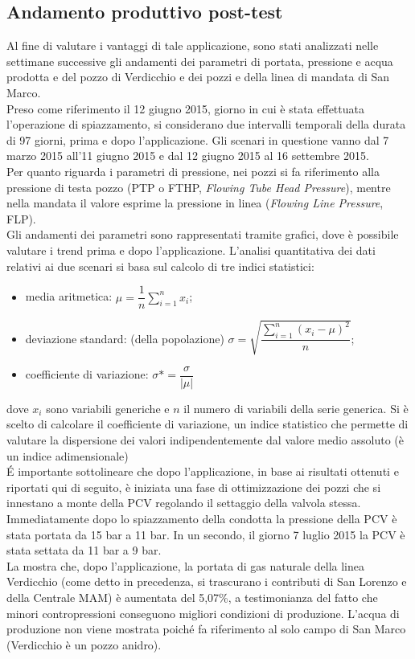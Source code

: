 \subsection{Andamento produttivo post-test}
Al fine di valutare i vantaggi di tale applicazione, sono stati analizzati nelle settimane successive gli andamenti dei parametri di portata, pressione e acqua prodotta e del pozzo di Verdicchio e dei pozzi e della linea di mandata di San Marco.\\
Preso come riferimento il 12 giugno 2015, giorno in cui è stata effettuata l'operazione di spiazzamento, si considerano due intervalli temporali della durata di 97 giorni, prima e dopo l'applicazione. Gli scenari in questione vanno dal 7 marzo 2015 all'11 giugno 2015 e dal 12 giugno 2015 al 16 settembre 2015.\\
Per quanto riguarda i parametri di pressione, nei pozzi si fa riferimento alla pressione di testa pozzo (PTP o FTHP, \textit{Flowing Tube Head Pressure}), mentre nella mandata il valore esprime la pressione in linea (\textit{Flowing Line Pressure}, FLP).\\
Gli andamenti dei parametri sono rappresentati tramite grafici, dove è possibile valutare i trend prima e dopo l'applicazione. L'analisi quantitativa dei dati relativi ai due scenari si basa sul calcolo di tre indici statistici: 
\begin{itemize}
\item media aritmetica: \(\mu=\dfrac{1}{n}\sum_{i=1}^n x_i\); 
\item deviazione standard: (della popolazione) \(\sigma= \sqrt{\dfrac{\sum_{i=1}^{n} (x_i-\mu)^2}{n}}\);
\item coefficiente di variazione: \(\sigma\ast= \dfrac{\sigma}{|\mu|}\)
\end{itemize}
dove \(x_i\) sono variabili generiche e \(n\) il numero di variabili della serie generica. Si è scelto di calcolare il coefficiente di variazione, un indice statistico che permette di valutare la dispersione dei valori indipendentemente dal valore medio assoluto (è un indice adimensionale)\\
\'E importante sottolineare che dopo l'applicazione, in base ai risultati ottenuti e riportati qui di seguito, è iniziata una fase di ottimizzazione dei pozzi che si innestano a monte della PCV regolando il settaggio della valvola stessa. Immediatamente dopo lo spiazzamento della condotta la pressione della PCV è stata portata da 15 bar a 11 bar. In un secondo, il giorno 7 luglio 2015 la PCV è stata settata da 11 bar a 9 bar.\\
La  mostra che, dopo l'applicazione, la portata di gas naturale della linea Verdicchio (come detto in precedenza, si trascurano i contributi di San Lorenzo e della Centrale MAM) è aumentata del 5,07\%, a testimonianza del fatto che minori contropressioni conseguono migliori condizioni di produzione. L'acqua di produzione non viene mostrata poiché fa riferimento al solo campo di San Marco (Verdicchio è un pozzo anidro).

